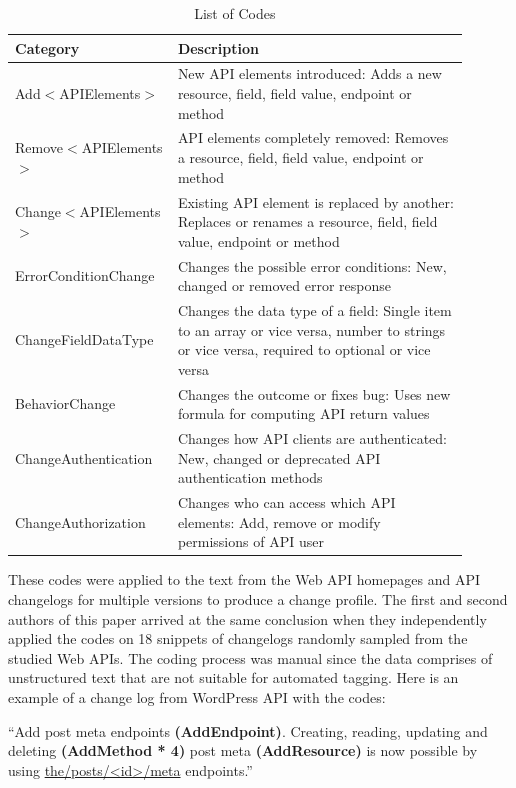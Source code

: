 \begin{table}[!htbp]
\caption{List of Codes}
\label{coding_scheme}
\begin{tabular}{|p{0.3\linewidth}|p{0.6\linewidth}|}
\hline
\textbf{Category} & \textbf{Description}\\
\hline
Add$<$APIElements$>$ & New API elements introduced: Adds a new resource, field, field value, endpoint or method\\
\hline
Remove$<$APIElements$>$ & API elements completely removed: Removes a resource, field, field value, endpoint or method\\
\hline
Change$<$APIElements$>$ & Existing API element is replaced by another: Replaces or renames a resource, field, field value, endpoint or method\\
\hline
ErrorConditionChange & Changes the possible error conditions: New, changed or removed error response \\
\hline
ChangeFieldDataType & Changes the data type of a field: Single item to an array or vice versa, number to strings or vice versa, required to optional or vice versa\\
\hline
BehaviorChange & Changes the outcome or fixes bug: Uses new formula for computing API return values\\
\hline
ChangeAuthentication & Changes how API clients are authenticated: New, changed or deprecated API authentication methods\\
\hline
ChangeAuthorization & Changes who can access which API elements: Add, remove or modify permissions of API user\\
\hline
\end{tabular}
\end{table}

These codes were applied to the text from the Web API homepages and API changelogs for multiple versions to produce a change profile. The first and second authors of this paper arrived at the same conclusion when they independently applied the  codes on 18 snippets of changelogs randomly sampled from the studied Web APIs. The coding process was manual since the data comprises of unstructured text that are not suitable for automated tagging. Here is an example of a change log from WordPress API with the codes:

\small
``Add post meta endpoints \textbf{(AddEndpoint)}.
Creating, reading, updating and deleting \textbf{(AddMethod * 4)}
post meta \textbf{(AddResource)} is now possible by
using \url{the/posts/<id>/meta} endpoints.''
\normalsize

